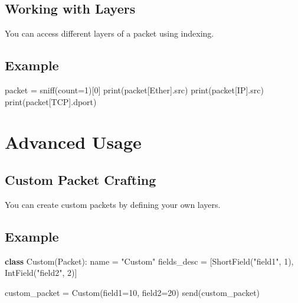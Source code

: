 \documentclass[
  letterpaper,
  DIV=11,
  numbers=noendperiod]{scrreprt}
\newenvironment{Shaded}{\begin{snugshade}}{\end{snugshade}}
\newcommand{\BuiltInTok}[1]{\textcolor[rgb]{0.00,0.23,0.31}{#1}}
\newcommand{\DecValTok}[1]{\textcolor[rgb]{0.68,0.00,0.00}{#1}}
\newcommand{\KeywordTok}[1]{\textcolor[rgb]{0.00,0.23,0.31}{\textbf{#1}}}
\newcommand{\NormalTok}[1]{\textcolor[rgb]{0.00,0.23,0.31}{#1}}
\newcommand{\OperatorTok}[1]{\textcolor[rgb]{0.37,0.37,0.37}{#1}}
\newcommand{\StringTok}[1]{\textcolor[rgb]{0.13,0.47,0.30}{#1}}
\begin{document}
\subsection{Working with Layers}\label{working-with-layers}

You can access different layers of a packet using indexing.

\subsection{Example}\label{example-67}

\begin{Shaded}
\begin{Highlighting}[]
\NormalTok{packet }\OperatorTok{=}\NormalTok{ sniff(count}\OperatorTok{=}\DecValTok{1}\NormalTok{)[}\DecValTok{0}\NormalTok{]}
\BuiltInTok{print}\NormalTok{(packet[Ether].src)}
\BuiltInTok{print}\NormalTok{(packet[IP].src)}
\BuiltInTok{print}\NormalTok{(packet[TCP].dport)}
\end{Highlighting}
\end{Shaded}

\section{Advanced Usage}\label{advanced-usage-2}

\subsection{Custom Packet Crafting}\label{custom-packet-crafting}

You can create custom packets by defining your own layers.

\subsection{Example}\label{example-68}

\begin{Shaded}
\begin{Highlighting}[]
\KeywordTok{class}\NormalTok{ Custom(Packet):}
\NormalTok{    name }\OperatorTok{=} \StringTok{"Custom"}
\NormalTok{    fields\_desc }\OperatorTok{=}\NormalTok{ [ShortField(}\StringTok{"field1"}\NormalTok{, }\DecValTok{1}\NormalTok{), IntField(}\StringTok{"field2"}\NormalTok{, }\DecValTok{2}\NormalTok{)]}

\NormalTok{custom\_packet }\OperatorTok{=}\NormalTok{ Custom(field1}\OperatorTok{=}\DecValTok{10}\NormalTok{, field2}\OperatorTok{=}\DecValTok{20}\NormalTok{)}
\NormalTok{send(custom\_packet)}
\end{Highlighting}
\end{Shaded}
\end{document}
